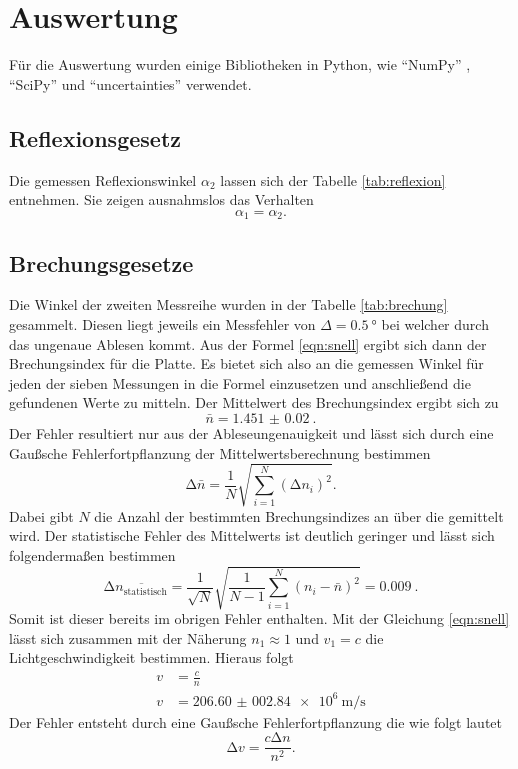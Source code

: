 \section{Auswertung}

Für die Auswertung wurden einige Bibliotheken in Python, wie \enquote{NumPy} \cite{numpy}, \enquote{SciPy} \cite{scipy} und \enquote{uncertainties} \cite{uncertainties} verwendet.

\subsection{Reflexionsgesetz}
Die gemessen Reflexionswinkel $\alpha_2$ lassen sich der Tabelle \ref{tab:reflexion} entnehmen. Sie zeigen ausnahmslos
das Verhalten
\begin{equation*}
    \alpha_1=\alpha_2.
\end{equation*}


\subsection{Brechungsgesetze}
\label{brechung}
Die Winkel der zweiten Messreihe wurden in der Tabelle \ref{tab:brechung} gesammelt. Diesen liegt jeweils ein Messfehler von
$\Delta = \SI{0.5}{\degree}$ bei welcher durch das ungenaue Ablesen kommt. Aus der Formel \eqref{eqn:snell} ergibt sich dann 
der Brechungsindex für die Platte. Es bietet sich also an die gemessen Winkel für jeden der sieben Messungen in die Formel einzusetzen 
und anschließend die gefundenen Werte zu mitteln. Der Mittelwert des Brechungsindex ergibt sich zu
\begin{equation}
    \label{eqn:n}
    \bar{n} = \SI{1.451(0020)}{}.
\end{equation}
Der Fehler resultiert nur aus der Ableseungenauigkeit und lässt sich durch eine Gaußsche Fehlerfortpflanzung der Mittelwertsberechnung bestimmen
\begin{equation*}
\increment \bar{n} = \frac{1}{N} \sqrt{\sum_{i=1}^{N} (\increment n_{i})^2}.
\end{equation*}
Dabei gibt $N$ die Anzahl der bestimmten Brechungsindizes an über die gemittelt wird.
Der statistische Fehler des Mittelwerts ist deutlich geringer und lässt sich folgendermaßen bestimmen
\begin{equation}
\increment \overline{n_{\text{statistisch}}} = \frac{1}{\sqrt{N}} \sqrt{\frac{1}{N-1}\sum_{i=1}^{N} (n_{i} -\bar{n})^2 } = \SI{0.009}{}. 
\end{equation}
Somit ist dieser bereits im obrigen Fehler enthalten. Mit der Gleichung \eqref{eqn:snell} lässt sich zusammen mit der Näherung $n_1 \approx 1$
und $v_1 = c$ \cite{scipy} die Lichtgeschwindigkeit bestimmen. Hieraus folgt
\begin{align*}
    v &= \frac{c}{n} \\
    v &= \SI{206.60(00284)e6}{\meter\per\second}
\end{align*}
Der Fehler entsteht durch eine Gaußsche Fehlerfortpflanzung die wie folgt lautet
\begin{equation}
    \increment v = \frac{c \increment n}{n^2}.
\end{equation}

